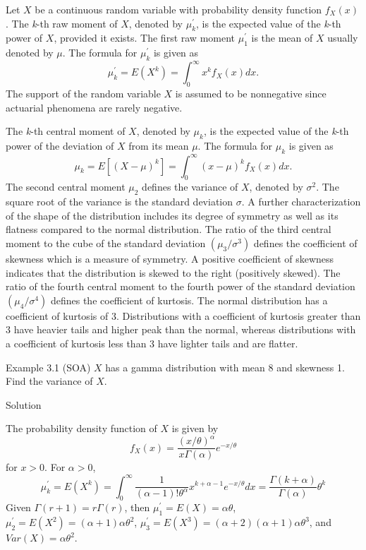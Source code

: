 \documentclass[]{book}
\theoremstyle{definition}
\theoremstyle{definition}
\theoremstyle{definition}
\theoremstyle{remark}
\begin{document}
Let \(X\) be a continuous random variable with probability density
function \(f_{X}\left( x \right)\). The \emph{k}-th raw moment of \(X\),
denoted by \(\mu_{k}^{\prime}\), is the expected value of the
\emph{k}-th power of \(X\), provided it exists. The first raw moment
\(\mu_{1}^{\prime}\) is the mean of \(X\) usually denoted by \(\mu\).
The formula for \(\mu_{k}^{\prime}\) is given as
\[\mu_{k}^{\prime} = E\left( X^{k} \right) = \int_{0}^{\infty}{x^{k}f_{X}\left( x \right)dx } .\]
The support of the random variable \(X\) is assumed to be nonnegative
since actuarial phenomena are rarely negative.

The \emph{k}-th central moment of \(X\), denoted by \(\mu_{k}\), is the
expected value of the \emph{k}-th power of the deviation of \(X\) from
its mean \(\mu\). The formula for \(\mu_{k}\) is given as
\[\mu_{k} = E\left\lbrack {(X - \mu)}^{k} \right\rbrack = \int_{0}^{\infty}{\left( x - \mu \right)^{k}f_{X}\left( x \right) dx }.\]
The second central moment \(\mu_{2}\) defines the variance of \(X\),
denoted by \(\sigma^{2}\). The square root of the variance is the
standard deviation \(\sigma\). A further characterization of the shape
of the distribution includes its degree of symmetry as well as its
flatness compared to the normal distribution. The ratio of the third
central moment to the cube of the standard deviation
\(\left( \mu_{3} / \sigma^{3} \right)\) defines the coefficient of
skewness which is a measure of symmetry. A positive coefficient of
skewness indicates that the distribution is skewed to the right
(positively skewed). The ratio of the fourth central moment to the
fourth power of the standard deviation
\(\left(\mu_{4} / \sigma^{4} \right)\) defines the coefficient of
kurtosis. The normal distribution has a coefficient of kurtosis of 3.
Distributions with a coefficient of kurtosis greater than 3 have heavier
tails and higher peak than the normal, whereas distributions with a
coefficient of kurtosis less than 3 have lighter tails and are flatter.

Example 3.1 (SOA) \(X\) has a gamma distribution with mean 8 and
skewness 1. Find the variance of \(X\).

Solution

The probability density function of \(X\) is given by
\[f_{X}\left( x \right) = \frac{\left( x / \theta \right)^{\alpha}}{x\Gamma\left( \alpha \right)} e^{- x / \theta} \]
for \(x > 0\). For \(\alpha>0\),
\[\mu_{k}^{\prime} = E\left( X^{k} \right) = \int_{0}^{\infty}{\frac{1}{\left( \alpha - 1 \right)!\theta^{\alpha}}x^{k + \alpha - 1}e^{- x / \theta} dx} = \frac{\Gamma\left( k + \alpha \right)}{\Gamma\left( \alpha \right)}\theta^{k}\]
Given \(\Gamma\left( r + 1 \right) = r\Gamma\left( r \right)\), then
\(\mu_{1}^{\prime} = E\left( X \right) = \alpha\theta\),
\(\mu_{2}^{\prime} = E\left( X^{2} \right) = \left( \alpha + 1 \right)\alpha\theta^{2}\),
\(\mu_{3}^{\prime} = E\left( X^{3} \right) = \left( \alpha + 2 \right)\left( \alpha + 1 \right)\alpha\theta^{3}\),
and \(Var\left( X \right) = \alpha\theta^{2}\).
\end{document}
